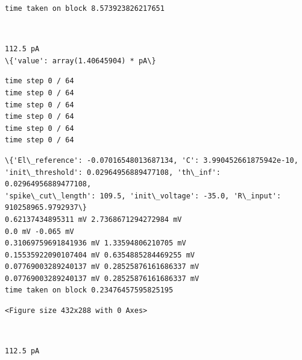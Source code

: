 {    \begin{Verbatim}[commandchars=\\\{\}]
time taken on block 8.573923826217651
    \end{Verbatim}


    
    \begin{center}
    \end{center}
    { \hspace*{\fill} \\}
    
    \begin{Verbatim}[commandchars=\\\{\}]
112.5 pA
\{'value': array(1.40645904) * pA\}
    \end{Verbatim}

    \begin{Verbatim}[commandchars=\\\{\}]
time step 0 / 64
time step 0 / 64
time step 0 / 64
time step 0 / 64
time step 0 / 64
time step 0 / 64
    \end{Verbatim}

    \begin{Verbatim}[commandchars=\\\{\}]
\{'El\_reference': -0.07016548013687134, 'C': 3.990452661875942e-10,
'init\_threshold': 0.02964956889477108, 'th\_inf': 0.02964956889477108,
'spike\_cut\_length': 109.5, 'init\_voltage': -35.0, 'R\_input': 910258965.9792937\}
0.62137434895311 mV 2.7368671294272984 mV
0.0 mV -0.065 mV
0.31069759691841936 mV 1.33594806210705 mV
0.15535922090107404 mV 0.6354885284469255 mV
0.07769003289240137 mV 0.28525876161686337 mV
0.07769003289240137 mV 0.28525876161686337 mV
time taken on block 0.23476457595825195
    \end{Verbatim}

    
    \begin{verbatim}
<Figure size 432x288 with 0 Axes>
    \end{verbatim}

    
    \begin{center}
    \end{center}
    { \hspace*{\fill} \\}
    
    \begin{Verbatim}[commandchars=\\\{\}]
112.5 pA
    \end{Verbatim}

}
